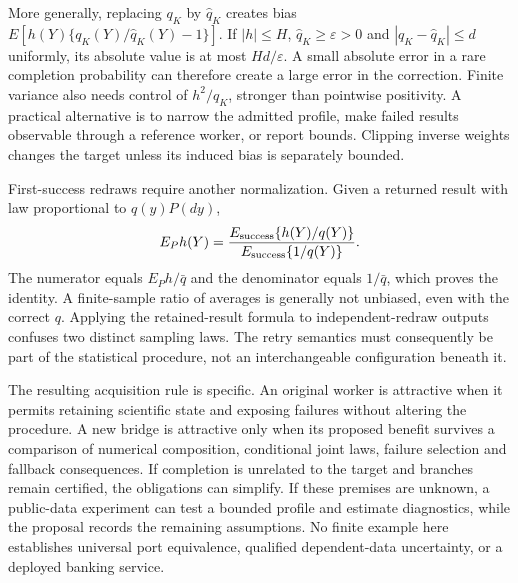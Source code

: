 More generally, replacing $q_K$ by $\widehat q_K$ creates bias
$E[h(Y)\{q_K(Y)/\widehat q_K(Y)-1\}]$. If $|h|\leq H$,
$\widehat q_K\geq\varepsilon>0$ and
$|q_K-\widehat q_K|\leq d$ uniformly, its absolute value is at most
$Hd/\varepsilon$. A small absolute error in a rare completion probability
can therefore create a large error in the correction. Finite variance also
needs control of $h^2/q_K$, stronger than pointwise positivity. A practical
alternative is to narrow the admitted profile, make failed results observable
through a reference worker, or report bounds. Clipping inverse weights changes
the target unless its induced bias is separately bounded.

First-success redraws require another normalization. Given a returned result
with law proportional to $q(y)P(dy)$,
\begin{equation}
 E_P h(Y)=
 \frac{E_{\rm success}\{h(Y)/q(Y)\}}
      {E_{\rm success}\{1/q(Y)\}}.
 \label{exec17:s9-redraw-weighting}
\end{equation}
The numerator equals $E_P h/\bar q$ and the denominator equals $1/\bar q$,
which proves the identity. A finite-sample ratio of averages is generally
not unbiased, even with the correct $q$. Applying the retained-result
formula to independent-redraw outputs confuses two distinct sampling laws.
The retry semantics must consequently be part of the statistical procedure,
not an interchangeable configuration beneath it.

The resulting acquisition rule is specific. An original worker is attractive
when it permits retaining scientific state and exposing failures without
altering the procedure. A new bridge is attractive only when its proposed
benefit survives a comparison of numerical composition, conditional joint
laws, failure selection and fallback consequences. If completion is unrelated
to the target and branches remain certified, the obligations can simplify.
If these premises are unknown, a public-data experiment can test a bounded
profile and estimate diagnostics, while the proposal records the remaining
assumptions. No finite example here establishes universal port equivalence,
qualified dependent-data uncertainty, or a deployed banking service.
